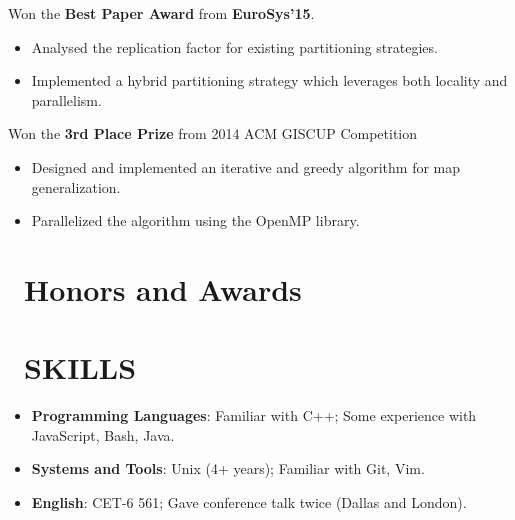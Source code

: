 \documentclass{resume}
\begin{document}
Won the \textbf{Best Paper Award} from \textbf{EuroSys'15}.
\begin{itemize}[leftmargin=*]
  \item {Analysed the replication factor for existing partitioning strategies.}
  \item {Implemented a hybrid partitioning strategy which leverages both locality and parallelism.}
\end{itemize}

Won the \textbf{3rd Place Prize} from 2014 ACM GISCUP Competition
\begin{itemize}[leftmargin=*]
  \item {Designed and implemented an iterative and greedy algorithm for map generalization.}
  \item {Parallelized the algorithm using the OpenMP library.}
\end{itemize}

\section{\faHeartO\ Honors and Awards}

\section{\faCogs\ SKILLS}
\begin{itemize}[leftmargin=*, parsep=1.0ex]
  \item {\textbf{Programming Languages}: Familiar with C++; Some experience with JavaScript, Bash, Java.}
  \item {\textbf{Systems and Tools}: Unix (4+ years); Familiar with Git, Vim.}
  \item {\textbf{English}: CET-6 561; Gave conference talk twice (Dallas and London).}
\end{itemize}
\end{document}

